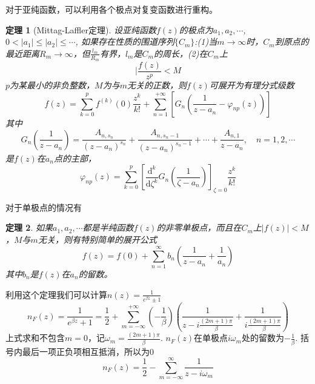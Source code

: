 \documentclass{article}
\numberwithin{equation}{subsection}
\newtheorem{theorem}{定理}
\begin{document}
对于亚纯函数，可以利用各个极点对复变函数进行重构。
\begin{theorem}[Mittag-Laffler定理]
    设亚纯函数$f(z)$的极点为$a_1,a_2,\cdots$, $0<|a_1|\leq|a_2|\leq\cdots$, 如果存在性质的围道序列$\{C_m\}$:(1)当$m\to\infty$时，$C_m$到原点的最近距离$R_m\to\infty$，但$\frac{l_m}{R_m}$有界，$l_m$是$C_m$的周长，(2)在$C_m$上
    \begin{equation}
        |\frac{f(z)}{z^p}<M
    \end{equation}
    $p$为某最小的非负整数，$M$为与$m$无关的正数，则$f(z)$可展开为有理分式级数
    \begin{equation}
        f(z)=\sum_{k=0}^{p}f^{(k)}(0)\frac{z^k}{k!}+\sum_{n=1}^{+\infty}\left[G_n(\frac{1}{z-a_n}-\varphi_{np}(z))\right]
    \end{equation}
    其中
    \begin{equation}
        G_n(\frac{1}{z-a_n})=\frac{A_{n,s_n}}{(z-a_n)^{s_n}}+\frac{A_{n,s_{n}-1}}{(z-a_n)^{s_n-1}}+\cdots+\frac{A_{n,1}}{z-a_n},\quad n=1,2,\cdots
    \end{equation}
    是$f(z)$在$a_n$点的主部，
    \begin{equation}
        \varphi_{np}(z)=\sum_{k=0}^p\left[\frac{\mathrm{d}^k}{\mathrm{d}\zeta^k}G_n(\frac{1}{\zeta-a_n})\right]_{\zeta=0}\frac{z^k}{k!}
    \end{equation}
\end{theorem}
对于单极点的情况有
\begin{theorem}
    如果$a_1,a_2,\cdots$都是半纯函数$f(z)$的非零单极点，而且在$C_m$上$|f(z)|<M$，$M$与$m$无关，则有特别简单的展开公式
    \begin{equation}
        f(z)=f(0)+\sum_{n=1}^{\infty}b_n\left(\frac{1}{z-a_n}+\frac{1}{a_n}\right)
    \end{equation}
    其中$b_n$是$f(z)$在$a_n$的留数。
\end{theorem}
利用这个定理我们可以计算$n(z)=\frac{1}{e^{\beta z}\pm 1}$
\begin{equation}
    n_F(z)=\frac{1}{e^{\beta z}+1}=\frac{1}{2}+\sum_{m=-\infty}^{+\infty}(-\frac{1}{\beta})\left(\frac{1}{z-i\frac{(2m+1)\pi}{\beta}}+\frac{1}{i\frac{(2m+1)\pi}{\beta}}\right)
\end{equation}
上式求和不包含$m=0$，记$\omega_m=\frac{(2m+1)\pi}{\beta}$. $n_F(z)$在单极点$i\omega_m$处的留数为$-\frac{1}{\beta}$. 括号内最后一项正负项相互抵消，所以为$0$
\begin{equation}
    n_F(z)=\frac{1}{2}-\sum_{m=-\infty}^{\infty}\frac{1}{z-i\omega_m}
\end{equation}
\end{document}
